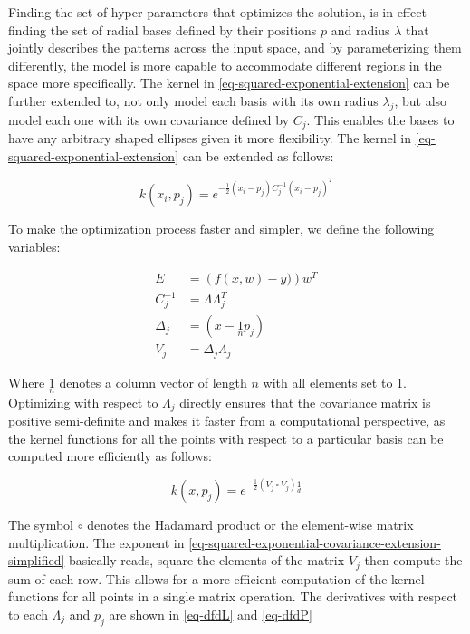 \documentclass[useAMS,usenatbib,fleqn]{mn2e}
\begin{document}
Finding the set of hyper-parameters that optimizes the solution, is in effect finding the set of radial bases defined by their positions $p$ and radius $\lambda$ that jointly describes the patterns across the input space, and by parameterizing them differently, the model is more capable to accommodate different regions in the space more specifically. The kernel in \eqref{eq-squared-exponential-extension} can be further extended to, not only model each basis with its own radius $\lambda_{j}$, but also model each one with its own covariance defined by $C_{j}$. This enables the bases to have any arbitrary shaped ellipses given it more flexibility. The kernel in \eqref{eq-squared-exponential-extension} can be extended as follows:

\begin{equation}
\label{eq-squared-exponential-covariance-extension}
k(x_{i},p_{j}) = e^{-\frac{1}{2}\left(x_{i}-p_{j}\right)C_{j}^{-1}\left(x_{i}-p_{j}\right)^{T}}
\end{equation}

To make the optimization process faster and simpler, we define the following variables:

\begin{subequations}
\begin{align} 
\label{eq-error}
E &= \left(f(x,w)-y)\right)w^{T}\\
\label{eq-Cinv}
C_{j}^{-1} &= \Lambda\Lambda_{j}^{T}\\
\label{eq-Delta_j}
\Delta_{j} &= \left(x-\underset{n}{1}p_{j}\right)\\
\label{eq-V_j}
V_{j} &= \Delta_{j}\Lambda_{j}
\end{align}
\end{subequations}

Where $\underset{n}{1}$ denotes a column vector of length $n$ with all elements set to 1. Optimizing with respect to $\Lambda_{j}$ directly ensures that the covariance matrix is positive semi-definite and makes it faster from a computational perspective, as the kernel functions for all the points with respect to a particular basis can be computed more efficiently as follows:

\begin{equation}
\label{eq-squared-exponential-covariance-extension-simplified}
k(x,p_{j}) = e^{-\frac{1}{2}\left(V_{j}\circ V_{j}\right)\underset{d}{1}}
\end{equation}

The symbol $\circ$ denotes the Hadamard product or the element-wise matrix multiplication. The exponent in \eqref{eq-squared-exponential-covariance-extension-simplified} basically reads, square the elements of the matrix $V_{j}$ then compute the sum of each row. This allows for a more efficient computation of the kernel functions for all points in a single matrix operation. The derivatives with respect to each $\Lambda_{j}$ and $p_{j}$ are shown in \eqref{eq-dfdL} and \eqref{eq-dfdP}
\end{document}
